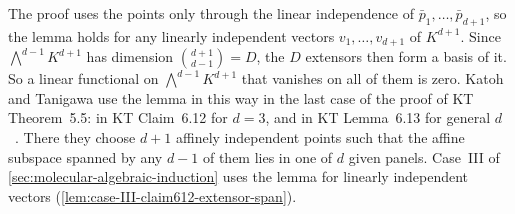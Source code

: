 The proof uses the points only through the linear independence of
$\bar p_1, \dots, \bar p_{d+1}$, so the lemma holds for any linearly
independent vectors $v_1, \dots, v_{d+1}$ of $K^{d+1}$. Since
$\bigwedge^{d-1} K^{d+1}$ has dimension $\binom{d+1}{d-1} = D$, the
$D$ extensors then form a basis of it. So a linear functional on
$\bigwedge^{d-1} K^{d+1}$ that vanishes on all of them is zero. Katoh
and Tanigawa use the lemma in this way in the last case of the proof
of KT Theorem~5.5: in KT Claim~6.12 for $d = 3$, and in KT Lemma~6.13
for general $d$~\cite[\S6.4]{katohTanigawa2011}. There they choose $d+1$
affinely independent points such that the affine subspace spanned by
any $d-1$ of them lies in one of $d$ given panels. Case~III of
\cref{sec:molecular-algebraic-induction} uses the lemma for linearly
independent vectors (\cref{lem:case-III-claim612-extensor-span}).
